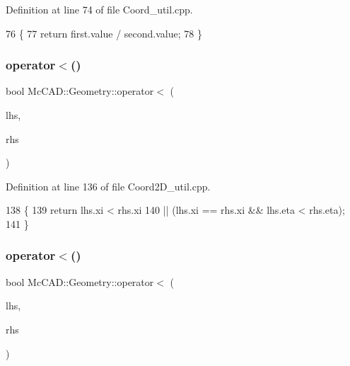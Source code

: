 Definition at line 74 of file Coord\+\_\+util.\+cpp.


\begin{DoxyCode}
76                             \{
77     \textcolor{keywordflow}{return} first.value / second.value;
78 \}
\end{DoxyCode}
\mbox{\label{namespaceMcCAD_1_1Geometry_a6dbab86e3f580738b7d843b880fc0caa}} 
\subsubsection{\texorpdfstring{operator$<$()}{operator<()}\hspace{0.1cm}{\footnotesize\ttfamily [1/3]}}
{\footnotesize\ttfamily bool Mc\+C\+A\+D\+::\+Geometry\+::operator$<$ (\begin{DoxyParamCaption}\item[{const \hyperlink{classMcCAD_1_1Geometry_1_1Coord2D}{Coord2D} \&}]{lhs,  }\item[{const \hyperlink{classMcCAD_1_1Geometry_1_1Coord2D}{Coord2D} \&}]{rhs }\end{DoxyParamCaption})}



Definition at line 136 of file Coord2\+D\+\_\+util.\+cpp.


\begin{DoxyCode}
138                            \{
139     \textcolor{keywordflow}{return} lhs.xi < rhs.xi
140             || (lhs.xi == rhs.xi && lhs.eta < rhs.eta);
141 \}
\end{DoxyCode}
\mbox{\label{namespaceMcCAD_1_1Geometry_a9472e1142568ff8bd1587356b40621a4}} 
\subsubsection{\texorpdfstring{operator$<$()}{operator<()}\hspace{0.1cm}{\footnotesize\ttfamily [2/3]}}
{\footnotesize\ttfamily bool Mc\+C\+A\+D\+::\+Geometry\+::operator$<$ (\begin{DoxyParamCaption}\item[{const \hyperlink{classMcCAD_1_1Geometry_1_1Coord}{Coord} \&}]{lhs,  }\item[{const \hyperlink{classMcCAD_1_1Geometry_1_1Coord}{Coord} \&}]{rhs }\end{DoxyParamCaption})}



